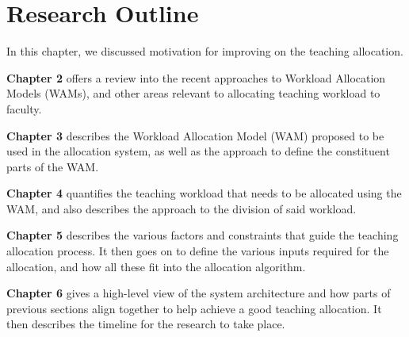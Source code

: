 \section{Research Outline}

In this chapter, we discussed motivation for improving on the teaching allocation.

\textbf{Chapter 2} offers a review into the recent approaches to Workload Allocation Models (WAMs), and other areas relevant to allocating teaching workload to faculty.

\textbf{Chapter 3} describes the Workload Allocation Model (WAM) proposed to be used in the allocation system, as well as the approach to define the constituent parts of the WAM.

\textbf{Chapter 4} quantifies the teaching workload that needs to be allocated using the WAM, and also describes the approach to the division of said workload.

\textbf{Chapter 5} describes the various factors and constraints that guide the teaching allocation process. It then goes on to define the various inputs required for the allocation, and how all these fit into the allocation algorithm.

\textbf{Chapter 6} gives a high-level view of the system architecture and how parts of previous sections align together to help achieve a good teaching allocation. It then describes the timeline for the research to take place.

